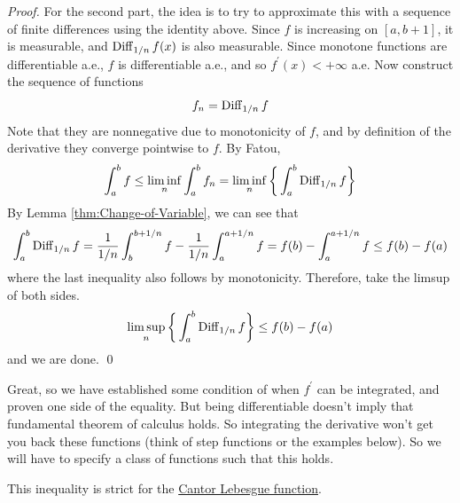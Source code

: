 \begin{proof}
    For the second part, the idea is to try to approximate this with a sequence of finite differences using the identity above. Since $f$ is increasing on $[a, b+1]$, it is measurable, and $\operatorname{Diff}_{1/n} f(x)$ is also measurable. Since monotone functions are differentiable a.e., $f$ is differentiable a.e., and so $f^\prime(x) < +\infty$ a.e. Now construct the sequence of functions 
    \begin{equation}
      f_n = \operatorname{Diff}_{1/n} f
    \end{equation}
    Note that they are nonnegative due to monotonicity of $f$, and by definition of the derivative they converge pointwise to $f$. By Fatou, 
    \begin{equation}
      \int_a^b f \leq \liminf_n \int_a^b f_n = \liminf_n \bigg\{\int_a^b \operatorname{Diff}_{1/n} f \bigg\}
    \end{equation}
    By Lemma \ref{thm:Change-of-Variable}, we can see that 
    \begin{equation}
      \int_a^b \operatorname{Diff}_{1/n} f = \frac{1}{1/n} \int_b^{b + 1/n} f - \frac{1}{1/n} \int_a^{a+1/n} f = f(b) - \int_a^{a + 1/n} f \leq f(b) - f(a)
    \end{equation}
    where the last inequality also follows by monotonicity. Therefore, take the limsup of both sides. 
    \begin{equation}
      \limsup_n \bigg\{ \int_a^b \operatorname{Diff}_{1/n} f \bigg\} \leq f(b) - f(a) 
    \end{equation}
    and we are done. \qed 
  \end{proof}

  Great, so we have established some condition of when $f^\prime$ can be integrated, and proven one side of the equality. But being differentiable doesn't imply that fundamental theorem of calculus holds. So integrating the derivative won't get you back these functions (think of step functions or the examples below). So we will have to specify a class of functions such that this holds. 

  \begin{example}
    \label{ex:strict-inequality}
    This inequality is strict for the \hyperref[real-def:cantor-lebesgue-function-devils-staircase]{Cantor Lebesgue function}. 
  \end{example}

